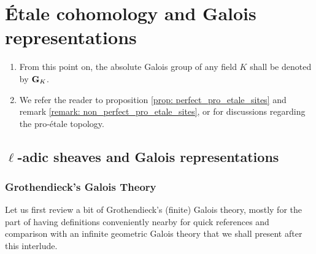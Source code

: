 \chapter{\'Etale cohomology and Galois representations} \label{chapter: etale_cohomology_2}
    \begin{abstract}
        
    \end{abstract}
    
    \minitoc
    
    \begin{convention}
        \noindent
        \begin{enumerate}
            \item From this point on, the absolute Galois group of any field $K$ shall be denoted by $\mathbf{G}_K$. 
            \item We refer the reader to proposition \ref{prop: perfect_pro_etale_sites} and remark \ref{remark: non_perfect_pro_etale_sites}, or \cite[Definition 4.1.1 and Remark 4.1.3]{bhatt_scholze_2014_pro_etale} for discussions regarding the pro-\'etale topology.
        \end{enumerate}
    \end{convention}
    
    \section{\texorpdfstring{$\ell$}{}-adic sheaves and Galois representations} \label{section: l_adic_sheaves}
        \subsection{Grothendieck's Galois Theory} \label{subsection: grothendieck_galois_theory}
            Let us first review a bit of Grothendieck's (finite) Galois theory, mostly for the part of having definitions conveniently nearby for quick references and comparison with an infinite geometric Galois theory that we shall present after this interlude.
            
